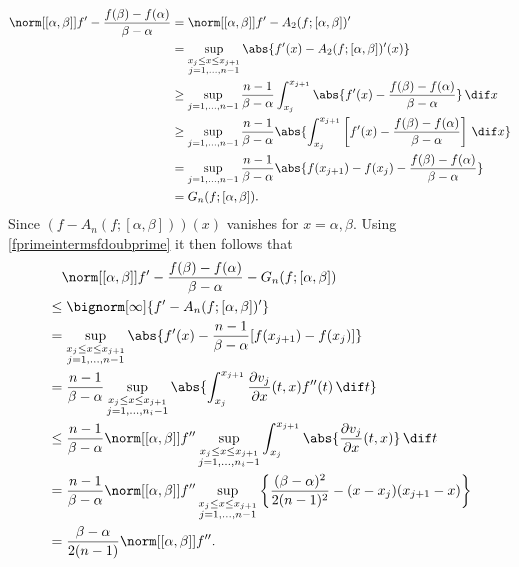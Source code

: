 \documentclass[]{elsarticle}
\theoremstyle{definition}
\theoremstyle{remark}
\newcommand{\GYnorm}[1]{\abs{#1}_{\cg_\cy}}
\begin{document}
\begin{align*}
\norm[{[\alpha, \beta]}]{f'-\frac{f(\beta)-f(\alpha)}{\beta-\alpha}} & = \norm[{[\alpha,\beta]}]{f'-A_2(f;[\alpha,\beta])'}\\
&= \sup_{\substack{x_j \le x \le x_{j+1}\\ j=1, \ldots, n-1 }} \abs{f'(x) - A_{2}(f;[\alpha,\beta])'(x)} \\
&\ge \sup_{j=1, \ldots, n-1} \frac{n-1}{\beta-\alpha}\int_{x_j}^{x_{j+1}} \abs{f'(x) - \frac{f(\beta)-f(\alpha)}{\beta-\alpha}} \, \dif x \\
&\ge \sup_{j=1, \ldots, n-1} \frac{n-1}{\beta-\alpha} \abs{\int_{x_j}^{x_{j+1}} \left[f'(x) -\frac{f(\beta)-f(\alpha)}{\beta-\alpha}\right] \, \dif x }\\
&= \sup_{j=1, \ldots, n-1} \frac{n-1}{\beta-\alpha} \abs{f(x_{j+1})-f(x_j) - \frac{f(\beta)-f(\alpha)}{\beta-\alpha}} \\
&=G_n(f;[\alpha,\beta]).
\end{align*}
%
%
Since $(f-A_{n}(f;[\alpha,\beta]))(x)$ vanishes for $x=\alpha,\beta$. Using \eqref{fprimeintermsfdoubprime} it then follows that
\begin{align*}
& \ \ \ \norm[{[\alpha, \beta]}]{f'-\frac{f(\beta)-f(\alpha)}{\beta-\alpha}} -G_n(f;[\alpha,\beta]) \\
& \le \bignorm[\infty]{f' -A_{n}(f;[\alpha,\beta])'} \\
& = \sup_{\substack{x_j \le x \le x_{j+1}\\ j=1, \ldots, n-1 }} \abs{f'(x) -\frac{n-1}{\beta-\alpha}[f(x_{j+1})-f(x_j)]} \\
&=\frac{n-1}{\beta-\alpha} \sup_{\substack{x_j \le x \le x_{j+1}\\ j=1, \ldots, n_i-1 }} \abs{ \int_{x_j}^{x_{j+1}} \frac{\partial v_j}{\partial x}(t,x) f''(t) \, \dif t} \\
& \le \frac{n-1}{\beta-\alpha} \norm[{[\alpha, \beta]}]{f''} \sup_{\substack{x_j \le x \le x_{j+1}\\ j=1, \ldots, n_i-1 }} \int_{x_j}^{x_{j+1}} \abs{\frac{\partial v_j}{\partial x}(t,x)} \, \dif t \\
&=\frac{n-1}{\beta-\alpha}\norm[{[\alpha, \beta]}]{f''} \sup_{\substack{x_j \le x \le x_{j+1}\\ j=1, \ldots, n-1 }} \left \{\frac{(\beta-\alpha)^2}{2(n-1)^2} - (x-x_j)(x_{j+1}-x) \right\} \\
&= \frac{\beta-\alpha}{2(n-1)}\norm[{[\alpha, \beta]}]{f''}.
\end{align*}
\end{document}
